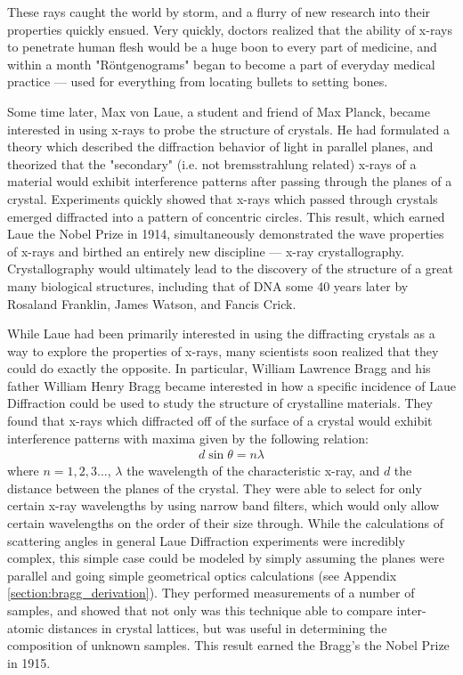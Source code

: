 \documentclass[%
 reprint,
 amsmath,amssymb,
 aps,
 pra,
]{revtex4-1}
\begin{document}
These rays caught the world by storm, and a flurry of new research into their properties quickly ensued. Very quickly, doctors realized that the ability of x-rays to penetrate human flesh would be a huge boon to every part of medicine, and within a month "R\"{o}ntgenograms" began to become a part of everyday medical practice --- used for everything from locating bullets to setting bones\cite{xray_history}.

Some time later, Max von Laue, a student and friend of Max Planck, became interested in using x-rays to probe the structure of crystals. He had formulated a theory which described the diffraction behavior of light in parallel planes, and theorized that the "secondary" (i.e. not bremsstrahlung related) x-rays of a material would exhibit interference patterns after passing through the planes of a crystal. Experiments quickly showed that x-rays which passed through crystals emerged diffracted into a pattern of concentric circles. This result, which earned Laue the Nobel Prize in 1914, simultaneously demonstrated the wave properties of x-rays and birthed an entirely new discipline --- x-ray crystallography\cite{laue}. Crystallography would ultimately lead to the discovery of the structure of a great many biological structures, including that of DNA some 40 years later by Rosaland Franklin, James Watson, and Fancis Crick\cite{dna1, dna2}.

While Laue had been primarily interested in using the diffracting crystals as a way to explore the properties of x-rays, many scientists soon realized that they could do exactly the opposite. In particular, William Lawrence Bragg and his father William Henry Bragg became interested in how a specific incidence of Laue Diffraction could be used to study the structure of crystalline materials. They found that x-rays which diffracted off of the surface of a crystal would exhibit interference patterns with maxima given by the following relation:
\begin{gather}\label{eq:bragg}
	d\sin\theta = n \lambda
\end{gather}
where $n = 1,2,3...$, $\lambda$ the wavelength of the characteristic x-ray, and $d$ the distance between the planes of the crystal. They were able to select for only certain x-ray wavelengths by using narrow band filters, which would only allow certain wavelengths on the order of their size through. While the calculations of scattering angles in general Laue Diffraction experiments were incredibly complex, this simple case could be modeled by simply assuming the planes were parallel and going simple geometrical optics calculations\cite{bragg} (see Appendix \ref{section:bragg_derivation}). They performed measurements of a number of samples, and showed that not only was this technique able to compare inter-atomic distances in crystal lattices, but was useful in determining the composition of unknown samples. This result earned the Bragg's the Nobel Prize in 1915.
\end{document}

